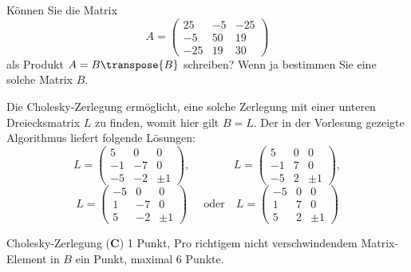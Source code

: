 Können Sie die Matrix 
\[
A
=
\begin{pmatrix}
 25& -5& -25\\
 -5& 50&  19\\
-25& 19&  30
\end{pmatrix}
\]
als Produkt $A=B\transpose{B}$ schreiben?
Wenn ja bestimmen Sie eine solche Matrix $B$.


\begin{loesung}
Die Cholesky-Zerlegung ermöglicht, eine solche Zerlegung 
mit einer unteren Dreiecksmatrix $L$ zu finden, womit hier gilt $B = L$. 
Der in der Vorlesung gezeigte Algorithmus liefert folgende Lösungen:
\[
L=\begin{pmatrix}
   5&  0&  0\\
  -1& -7&  0\\
  -5& -2& \pm 1
\end{pmatrix},
\quad\phantom{\text{oder}}\quad
L=\begin{pmatrix}
   5&  0&  0\\
  -1&  7&  0\\
  -5&  2& \pm 1
\end{pmatrix},
\]
\[
L=\begin{pmatrix}
  -5&  0&  0\\
   1& -7&  0\\
   5& -2& \pm 1
\end{pmatrix}\phantom{,}
\quad\text{oder}\quad
L=\begin{pmatrix}
  -5&  0&  0\\
   1&  7&  0\\
   5&  2& \pm 1
\end{pmatrix}
\]

\end{loesung}

\begin{bewertung}
Cholesky-Zerlegung ({\bf C}) 1 Punkt, Pro richtigem nicht verschwindendem Matrix-Element in $B$ ein
Punkt, maximal 6 Punkte.
\end{bewertung}
